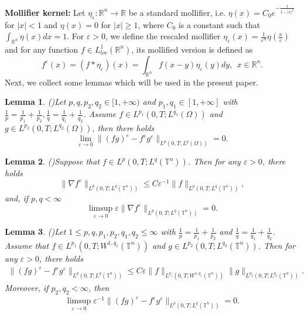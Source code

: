 \documentclass[11pt]{article}
\theoremstyle{plain}\newtheorem{definition}{Definition}[section]
\theoremstyle{definition}\newtheorem{theorem}{Theorem}[section]
\theoremstyle{plain}\newtheorem{lemma}[theorem]{Lemma}
\theoremstyle{plain}\newtheorem{coro}[theorem]{Corollary}
\theoremstyle{plain}\newtheorem{prop}[theorem]{Proposition}
\theoremstyle{remark}\newtheorem{remark}{Remark}[section]
\newcommand{\be}{\begin{equation}}
\newcommand{\ee}{\end{equation}}
\numberwithin{equation}{section}
\begin{document}
{\bf Mollifier kernel:} Let $\eta_{\varepsilon}:\mathbb{R}^{n}\rightarrow \mathbb{R}$ be a standard mollifier, i.e. $\eta(x)=C_0e^{-\frac{1}{1-|x|^2}}$ for $|x|<1$ and $\eta(x)=0$ for $|x|\geq 1$, where $C_0$ is a constant such that $\int_{\mathbb{R}^n}\eta (x) dx=1$. For $\varepsilon>0$, we define the rescaled mollifier $\eta_{\varepsilon}(x)=\frac{1}{\varepsilon^n}\eta(\frac{x}{\varepsilon})$ and for  any function $f\in L^1_{loc}(\mathbb{R}^n)$, its mollified version is defined as
$$f^\varepsilon(x)=(f*\eta_{\varepsilon})(x)=\int_{\mathbb{R}^n}f(x-y)\eta_{\varepsilon}(y)dy,\ \ x\in \mathbb{R}^n.$$
Next, we collect  some lemmas  which will be used in the present paper.
\begin{lemma}(\cite{[YWW]})\label{lem2.3}
	Let $ p, q, p_2, q_2\in[1,+\infty)$ and $p_1, q_1\in[1,+\infty]$  with
	$\frac{1}{p}=\frac{1}{p_1}+\frac{1}{p_2},\frac{1}{q}=\frac{1}{q_1}+\frac{1}{q_2} $. Assume $f\in L^{p_1}(0,T;L^{q_1}(\Omega)) $ and $g\in
	L^{p_2}(0,T;L^{q_2}(\Omega))$, then   there holds
	\begin{equation}\label{a4}
		\lim_{\varepsilon\rightarrow0}\| (f g)^{\varepsilon}  - f^{\varepsilon}   g ^{\varepsilon} \|_{L^p(0,T;L^q(\Omega))}= 0.
	\end{equation}
	
\end{lemma}
\begin{lemma}(\cite{[NNT]})\label{lem2.1}
Suppose that $f\in L^{p}(0,T;L^{q}(\mathbb{T}^{n}))$. Then for any $\varepsilon>0$, there holds
\be\label{2.1}
\|\nabla f^{\varepsilon}\|_{L^{p}(0,T;L^{q}(\mathbb{T}^{n}))}
\leq C\varepsilon^{-1}\| f\|_{L^{p}(0,T;L^{q}(\mathbb{T}^{n}))},
\ee
and, if $p,q<\infty$
\be\label{2.2}
\limsup_{\varepsilon\rightarrow0} \varepsilon\|\nabla f^{\varepsilon}\|_{L^{p}(0,T;L^{q}(\mathbb{T}^{n}))}=0.
\ee

\end{lemma}

\begin{lemma} (\cite{[NNT],[WY]})\label{lem2.7}   Let $1\leq p,q,p_1,p_2,q_1,q_2\leq \infty$  with $\frac{1}{p}=\frac{1}{p_1}+\frac{1}{p_2}$ and $\frac{1}{q}=\frac{1}{q_1}+\frac{1}{q_2}$. Assume that $f\in L^{p_1}(0,T;W^{1,q_1}(\mathbb{T}^n))$ and $g\in L^{p_2}(0,T;L^{q_2}(\mathbb{T}^n))$. Then for any $\varepsilon> 0$, there holds
		\begin{align} \label{fg'}
		\|(fg)^\varepsilon-f^\varepsilon g^\varepsilon\|_{L^p(0,T;L^q(\mathbb{T}^n))}\leq C\varepsilon \|f\|_{L^{p_1}(0,T;W^{1,q_1}( \mathbb{T}^n))}\|g\|_{L^{p_2}(0,T;L^{q_2}(\mathbb{T}^n))}.
		\end{align}
		Moreover, if $p_2,q_2<\infty$, then
		\begin{align}\label{limite'}
		\limsup_{\varepsilon \to 0}\varepsilon^{-1} \|(fg)^\varepsilon-f^\varepsilon g^\varepsilon\|_{L^p(0,T;L^q(\mathbb{T}^n))}=0.
		\end{align}
	\end{lemma}
\end{document}
